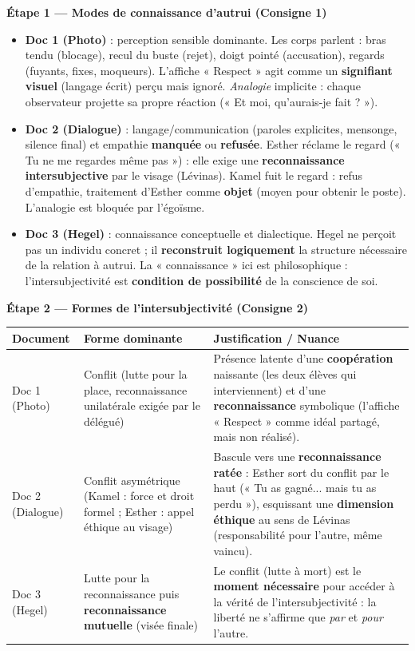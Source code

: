 \documentclass[11pt]{article}
\newcommand{\cle}[1]{{\popxbold\color{popdark}#1}}
\newcounter{popsec}
\newcounter{popsub}
\newcommand{\courssub}[1]{%
  \stepcounter{popsub}%
  \par\vspace{9pt}\noindent{\popxbold\fontsize{11.5}{13}\selectfont\color{popink}{\color{poporange}\thepopsec.\thepopsub}\hspace{6pt}#1}\par\nopagebreak\vspace{4pt}
}
\begin{document}
\courssub{Démarche et corrigé commenté}
\begin{exoresolu}
\textbf{Étape 1 — Modes de connaissance d'autrui (Consigne 1)}
\begin{itemize}
    \item \textbf{Doc 1 (Photo)} : \cle{perception sensible} dominante. Les corps parlent : bras tendu (blocage), recul du buste (rejet), doigt pointé (accusation), regards (fuyants, fixes, moqueurs). L'affiche « Respect » agit comme un \textbf{signifiant visuel} (langage écrit) perçu mais ignoré. \emph{Analogie} implicite : chaque observateur projette sa propre réaction (« Et moi, qu'aurais-je fait ? »).
    \item \textbf{Doc 2 (Dialogue)} : \cle{langage/communication} (paroles explicites, mensonge, silence final) et \cle{empathie} \textbf{manquée} ou \textbf{refusée}. Esther réclame le regard (« Tu ne me regardes même pas ») : elle exige une \textbf{reconnaissance intersubjective} par le visage (Lévinas). Kamel fuit le regard : refus d'empathie, traitement d'Esther comme \textbf{objet} (moyen pour obtenir le poste). L'analogie est bloquée par l'égoïsme.
    \item \textbf{Doc 3 (Hegel)} : connaissance \cle{conceptuelle et dialectique}. Hegel ne perçoit pas un individu concret ; il \textbf{reconstruit logiquement} la structure nécessaire de la relation à autrui. La « connaissance » ici est philosophique : l'intersubjectivité est \textbf{condition de possibilité} de la conscience de soi.
\end{itemize}

\textbf{Étape 2 — Formes de l'intersubjectivité (Consigne 2)}
\begin{center}
\begin{tabularx}{\linewidth}{|l|X|X|}\hline
\rowcolor{popblueL}\textbf{Document} & \textbf{Forme dominante} & \textbf{Justification / Nuance} \\ \hline
Doc 1 (Photo) & \cle{Conflit} (lutte pour la place, reconnaissance unilatérale exigée par le délégué) & Présence latente d'une \textbf{coopération} naissante (les deux élèves qui interviennent) et d'une \textbf{reconnaissance} symbolique (l'affiche « Respect » comme idéal partagé, mais non réalisé). \\ \hline
Doc 2 (Dialogue) & \cle{Conflit} asymétrique (Kamel : force et droit formel ; Esther : appel éthique au visage) & Bascule vers une \textbf{reconnaissance ratée} : Esther sort du conflit par le haut (« Tu as gagné... mais tu as perdu »), esquissant une \textbf{dimension éthique} au sens de Lévinas (responsabilité pour l'autre, même vaincu). \\ \hline
Doc 3 (Hegel) & \cle{Lutte pour la reconnaissance} puis \textbf{reconnaissance mutuelle} (visée finale) & Le conflit (lutte à mort) est le \textbf{moment nécessaire} pour accéder à la vérité de l'intersubjectivité : la liberté ne s'affirme que \emph{par} et \emph{pour} l'autre. \\ \hline
\end{tabularx}
\end{center}


\end{exoresolu}
\end{document}
